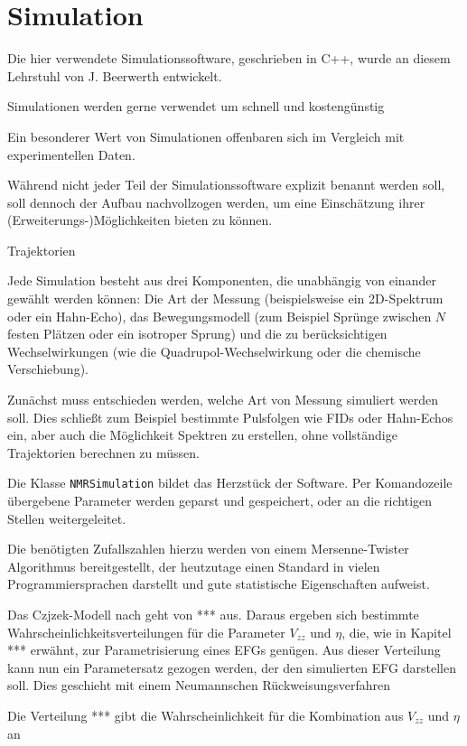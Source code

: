 \chapter{Simulation}\label{chapter:simulation}

Die hier verwendete Simulationssoftware, geschrieben in C++, wurde an diesem Lehrstuhl von J. Beerwerth entwickelt.


Simulationen werden gerne verwendet um schnell und kostengünstig


Ein besonderer Wert von Simulationen offenbaren sich im Vergleich mit experimentellen Daten.



Während nicht jeder Teil der Simulationssoftware explizit benannt werden soll, soll dennoch der Aufbau nachvollzogen werden, um eine Einschätzung ihrer (Erweiterungs-)Möglichkeiten bieten zu können.


Trajektorien


Jede Simulation besteht aus drei Komponenten, die unabhängig von einander gewählt werden können: Die Art der Messung (beispielsweise ein 2D-Spektrum oder ein Hahn-Echo), das Bewegungsmodell (zum Beispiel Sprünge zwischen $N$ festen Plätzen oder ein isotroper Sprung) und die zu berücksichtigen Wechselwirkungen (wie die Quadrupol-Wechselwirkung oder die chemische Verschiebung).




Zunächst muss entschieden werden, welche Art von Messung simuliert werden soll. Dies schließt zum Beispiel bestimmte Pulsfolgen wie FIDs oder Hahn-Echos ein, aber auch die Möglichkeit Spektren zu erstellen, ohne vollständige Trajektorien berechnen zu müssen.


Die Klasse \texttt{NMRSimulation} bildet das Herzstück der Software. Per Komandozeile übergebene Parameter werden geparst und gespeichert, oder an die richtigen Stellen weitergeleitet.


Die benötigten Zufallszahlen hierzu werden von einem Mersenne-Twister Algorithmus bereitgestellt, der heutzutage einen Standard in vielen Programmiersprachen darstellt und gute statistische Eigenschaften aufweist.



Das Czjzek-Modell nach \cite{} geht von *** aus. Daraus ergeben sich bestimmte Wahrscheinlichkeitsverteilungen für die Parameter $V_{zz}$ und $\eta$, die, wie in Kapitel *** erwähnt, zur Parametrisierung eines EFGs genügen. Aus dieser Verteilung kann nun ein Parametersatz gezogen werden, der den simulierten EFG darstellen soll. Dies geschieht mit einem Neumannschen Rückweisungsverfahren

Die Verteilung *** gibt die Wahrscheinlichkeit für die Kombination aus $V_{zz}$ und $\eta$ an

